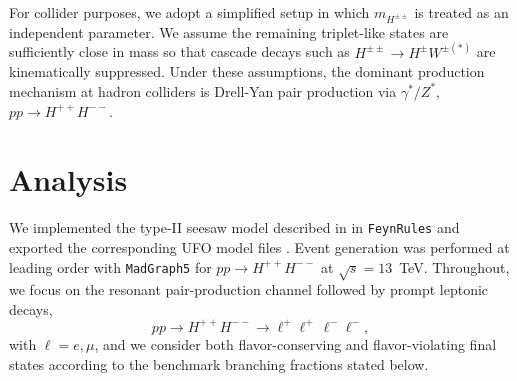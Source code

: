 \documentclass[aps, prev, twocolumn, preprintnumbers, floatfix, nofootinbib]{revtex4-1}
\begin{document}
For collider purposes, we adopt a simplified setup in which $m_{H^{\pm\pm}}$ is treated as an independent parameter. We assume the remaining triplet-like states are sufficiently close in mass so that cascade decays such as $H^{\pm\pm}\to H^\pm W^{\pm(*)}$ are kinematically suppressed. Under these assumptions, the dominant production mechanism at hadron colliders is Drell-Yan pair production via $\gamma^*/Z^*$, $pp\to H^{++}H^{--}$.

\section{Analysis \label{SecIII_Ana}}

We implemented the type-II seesaw model described in  in \texttt{FeynRules} \cite{Alloul:2013bka} and exported the corresponding UFO model files \cite{Degrande:2011ua}. Event generation was performed at leading order with \texttt{MadGraph5} \cite{Alwall:2011uj} for $pp\to H^{++}H^{--}$ at $\sqrt{s}=13$~TeV.  Throughout, we focus on the resonant pair-production channel followed by prompt leptonic decays,
\begin{equation}
pp\to H^{++}H^{--}\to \ell^+\ell^+\,\ell^-\ell^-,
\end{equation}
with $\ell=e,\mu$, and we consider both flavor-conserving and flavor-violating final states according to the benchmark branching fractions stated below.


\end{document}
